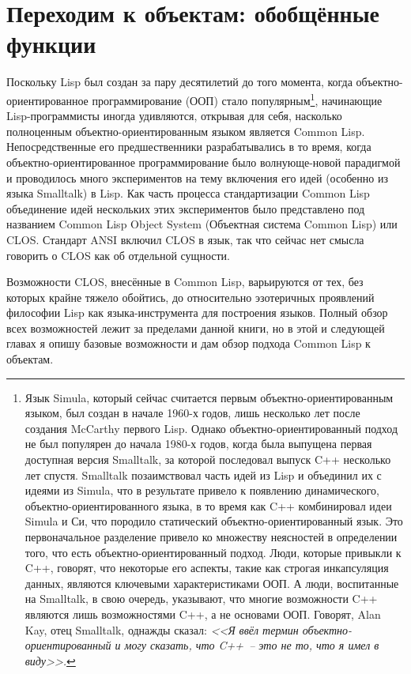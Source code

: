 \chapter{Переходим к объектам: обобщённые функции}
\label{ch:16}

Поскольку Lisp был создан за пару десятилетий до того момента, когда
объектно-ориентированное программирование (ООП) стало популярным\footnote{Язык Simula,
  который сейчас считается первым объектно-ориентированным языком, был создан в начале
  1960-х годов, лишь несколько лет после создания McCarthy первого Lisp.  Однако
  объектно-ориентированный подход не был популярен до начала 1980-х годов, когда была
  выпущена первая доступная версия Smalltalk, за которой последовал выпуск C++ несколько
  лет спустя.  Smalltalk позаимствовал часть идей из Lisp и объединил их с идеями из
  Simula, что в результате привело к появлению динамического, объектно-ориентированного
  языка, в то время как C++ комбинировал идеи Simula и Си, что породило статический
  объектно-ориентированный язык. Это первоначальное разделение привело ко множеству
  неясностей в определении того, что есть объектно-ориентированный подход.  Люди, которые
  привыкли к C++, говорят, что некоторые его аспекты, такие как строгая инкапсуляция
  данных, являются ключевыми характеристиками ООП. А люди, воспитанные на Smalltalk, в
  свою очередь, указывают, что многие возможности C++ являются лишь возможностями C++, а не
  основами ООП.  Говорят, Alan Kay, отец Smalltalk, однажды сказал: \textit{<<Я ввёл термин
    объектно-ориентированный и могу сказать, что C++~-- это не то, что я имел в виду>>.}},
начинающие Lisp-программисты иногда удивляются, открывая для себя, насколько полноценным
объектно-ориентированным языком является Common Lisp.  Непосредственные его
предшественники разрабатывались в то время, когда объектно-ориентированное
программирование было волнующе-новой парадигмой и проводилось много экспериментов на тему
включения его идей (особенно из языка Smalltalk) в Lisp.  Как часть процесса
стандартизации Common Lisp объединение идей нескольких этих экспериментов было
представлено под названием Common Lisp Object System (Объектная система Common Lisp) или
CLOS. Стандарт ANSI
включил CLOS в язык, так что сейчас нет смысла говорить о CLOS как об отдельной сущности.

Возможности CLOS, внесённые в Common Lisp, варьируются от тех, без которых крайне тяжело
обойтись, до относительно эзотеричных проявлений философии Lisp как языка-инструмента для
построения языков.  Полный обзор всех возможностей лежит за пределами данной книги, но в
этой и следующей главах я опишу базовые возможности и дам обзор подхода Common Lisp к
объектам.

